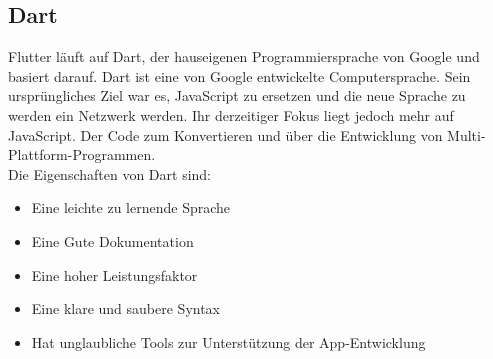 \subsection{Dart}
Flutter läuft auf Dart, der hauseigenen Programmiersprache von Google und basiert darauf.
Dart ist eine von Google entwickelte Computersprache. Sein ursprüngliches Ziel war es, JavaScript zu ersetzen und die neue Sprache zu werden
ein Netzwerk werden. Ihr derzeitiger Fokus liegt jedoch mehr auf JavaScript.
Der Code zum Konvertieren und über die Entwicklung von Multi-Plattform-Programmen.\\
Die Eigenschaften von Dart sind:
\begin{itemize}
\item Eine leichte zu lernende Sprache
\item Eine Gute Dokumentation
\item Eine hoher Leistungsfaktor
\item Eine klare und saubere Syntax
\item Hat unglaubliche Tools zur Unterstützung der App-Entwicklung
\end{itemize}
